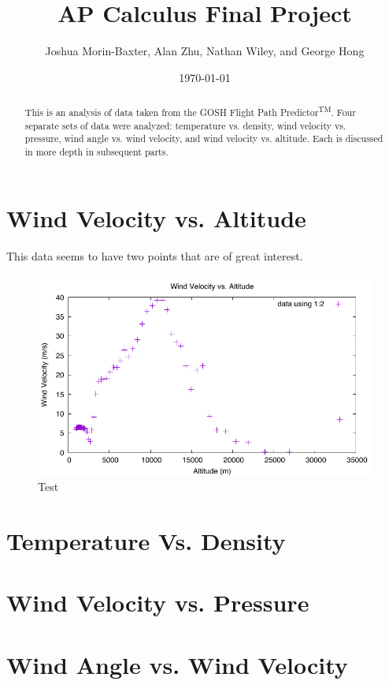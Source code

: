 \documentclass{journal}
\begin{document}
\title{AP Calculus Final Project}
\author{Joshua Morin-Baxter, Alan Zhu, Nathan Wiley, and George Hong}
\date{\today}

\maketitle

\begin{abstract}
This is an analysis of data taken from the GOSH Flight Path Predictor\textsuperscript{TM}.
Four separate sets of data were analyzed:
temperature vs. density, wind velocity vs. pressure, wind angle vs. wind velocity, and wind velocity vs. altitude.
Each is discussed in more depth in subsequent parts.
\end{abstract}

\part{Wind Velocity vs. Altitude}
This data seems to have two points that are of great interest.
\begin{figure}[h]
\centering
\includegraphics{josh-images/figure1.pdf}
\caption{Test}

\end{figure}


\part{Temperature Vs. Density}

\part{Wind Velocity vs. Pressure}

\part{Wind Angle vs. Wind Velocity}
\end{document}
